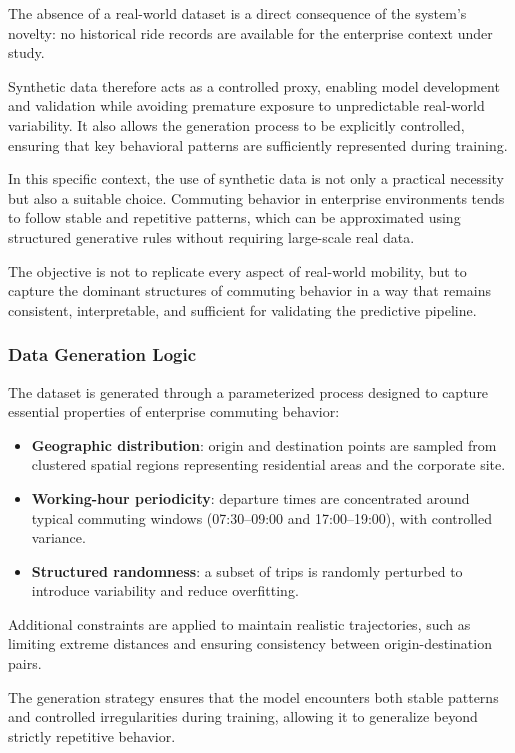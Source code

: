 The absence of a real-world dataset is a direct consequence of the system’s novelty: no historical ride records are available for the enterprise context under study.

Synthetic data therefore acts as a controlled proxy, enabling model development and validation while avoiding premature exposure to unpredictable real-world variability. It also allows the generation process to be explicitly controlled, ensuring that key behavioral patterns are sufficiently represented during training.

In this specific context, the use of synthetic data is not only a practical necessity but also a suitable choice. Commuting behavior in enterprise environments tends to follow stable and repetitive patterns, which can be approximated using structured generative rules without requiring large-scale real data.

The objective is not to replicate every aspect of real-world mobility, but to capture the dominant structures of commuting behavior in a way that remains consistent, interpretable, and sufficient for validating the predictive pipeline.
\subsubsection{Data Generation Logic}

The dataset is generated through a parameterized process designed to capture essential properties of enterprise commuting behavior:

\begin{itemize}
    \item \textbf{Geographic distribution}: origin and destination points are sampled from clustered spatial regions representing residential areas and the corporate site.
    \item \textbf{Working-hour periodicity}: departure times are concentrated around typical commuting windows (07:30--09:00 and 17:00--19:00), with controlled variance.
    \item \textbf{Structured randomness}: a subset of trips is randomly perturbed to introduce variability and reduce overfitting.
\end{itemize}

Additional constraints are applied to maintain realistic trajectories, such as limiting extreme distances and ensuring consistency between origin-destination pairs.

The generation strategy ensures that the model encounters both stable patterns and controlled irregularities during training, allowing it to generalize beyond strictly repetitive behavior.

